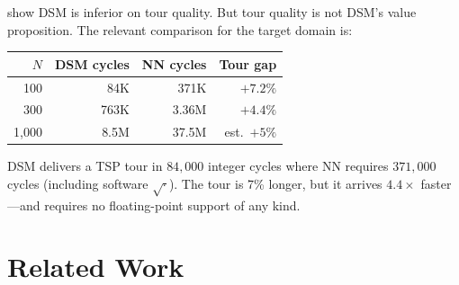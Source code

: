 \documentclass[11pt,a4paper,twocolumn]{article}
\begin{document}
 show DSM is inferior on tour quality. But tour quality is not DSM's value proposition. The relevant comparison for the target domain is:

\smallskip
\noindent\begin{minipage}{\columnwidth}
\centering\small
{}\label{tab:mcu}
\smallskip
\begin{tabular}{@{}rrrr@{}}
\toprule
$N$ & DSM cycles & NN cycles & Tour gap \\
\midrule
100 & 84K & 371K & $+7.2\%$ \\
300 & 763K & 3.36M & $+4.4\%$ \\
1,000 & 8.5M & 37.5M & est.\ $+5\%$ \\
\bottomrule
\end{tabular}
\end{minipage}
\medskip

DSM delivers a TSP tour in $84{,}000$ integer cycles where NN requires $371{,}000$ cycles (including software $\sqrt{\cdot}$). The tour is 7\% longer, but it arrives $4.4\times$ faster---and requires no floating-point support of any kind.

\FloatBarrier
\section{Related Work}\label{sec:related}

\smallskip
\noindent\begin{minipage}{\columnwidth}
\centering\footnotesize
{}\label{tab:related}
\smallskip
{}
\end{minipage}
\medskip
\end{document}

